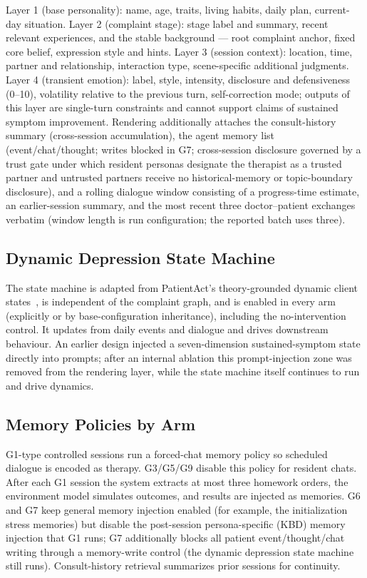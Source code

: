 \documentclass[10pt]{article}
\begin{document}
Layer 1 (base personality): name, age, traits, living habits, daily plan, current-day situation.
Layer 2 (complaint stage): stage label and summary, recent relevant experiences, and the stable background --- root complaint anchor, fixed core belief, expression style and hints.
Layer 3 (session context): location, time, partner and relationship, interaction type, scene-specific additional judgments.
Layer 4 (transient emotion): label, style, intensity, disclosure and defensiveness (0--10), volatility relative to the previous turn, self-correction mode; outputs of this layer are single-turn constraints and cannot support claims of sustained symptom improvement.
Rendering additionally attaches the consult-history summary (cross-session accumulation), the agent memory list (event/chat/thought; writes blocked in G7; cross-session disclosure governed by a trust gate under which resident personas designate the therapist as a trusted partner and untrusted partners receive no historical-memory or topic-boundary disclosure), and a rolling dialogue window consisting of a progress-time estimate, an earlier-session summary, and the most recent three doctor--patient exchanges verbatim (window length is run configuration; the reported batch uses three).

\subsection{Dynamic Depression State Machine}

The state machine is adapted from PatientAct's theory-grounded dynamic client states~\citep{patientact2026}, is independent of the complaint graph, and is enabled in every arm (explicitly or by base-configuration inheritance), including the no-intervention control.
It updates from daily events and dialogue and drives downstream behaviour.
An earlier design injected a seven-dimension sustained-symptom state directly into prompts; after an internal ablation this prompt-injection zone was removed from the rendering layer, while the state machine itself continues to run and drive dynamics.

\subsection{Memory Policies by Arm}

G1-type controlled sessions run a forced-chat memory policy so scheduled dialogue is encoded as therapy.
G3/G5/G9 disable this policy for resident chats.
After each G1 session the system extracts at most three homework orders, the environment model simulates outcomes, and results are injected as memories.
G6 and G7 keep general memory injection enabled (for example, the initialization stress memories) but disable the post-session persona-specific (KBD) memory injection that G1 runs; G7 additionally blocks all patient event/thought/chat writing through a memory-write control (the dynamic depression state machine still runs).
Consult-history retrieval summarizes prior sessions for continuity.
\end{document}
